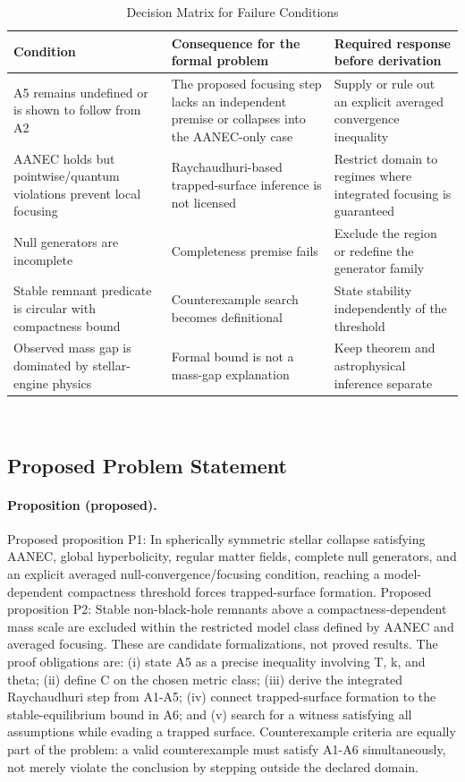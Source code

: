 \documentclass[conference]{IEEEtran}
\begin{document}
\begin{table}[htbp]
\centering
\footnotesize
\setlength{\tabcolsep}{3pt}
\renewcommand{\arraystretch}{1.12}
\caption{Decision Matrix for Failure Conditions}
\label{tab:formal-problem-and-hypotheses-fp-06}
\begin{tabular}{|p{}|p{}|p{}|}
\hline
Condition & Consequence for the formal problem & Required response before derivation \\\hline
A5 remains undefined or is shown to follow from A2 & The proposed focusing step lacks an independent premise or collapses into the AANEC-only case & Supply or rule out an explicit averaged convergence inequality \\\hline
AANEC holds but pointwise/quantum violations prevent local focusing & Raychaudhuri-based trapped-surface inference is not licensed & Restrict domain to regimes where integrated focusing is guaranteed \\\hline
Null generators are incomplete & Completeness premise fails & Exclude the region or redefine the generator family \\\hline
Stable remnant predicate is circular with compactness bound & Counterexample search becomes definitional & State stability independently of the threshold \\\hline
Observed mass gap is dominated by stellar-engine physics & Formal bound is not a mass-gap explanation & Keep theorem and astrophysical inference separate \\\hline
\end{tabular}
\end{table}~\cite{cite_0ed84243cf171bc4,cite_7a44e6730c44cb39,cite_c369df652181e8f7}

\subsection{Proposed Problem Statement}
\paragraph{Proposition (proposed).} Proposed proposition P1: In spherically symmetric stellar collapse satisfying AANEC, global hyperbolicity, regular matter fields, complete null generators, and an explicit averaged null-convergence/focusing condition, reaching a model-dependent compactness threshold forces trapped-surface formation. Proposed proposition P2: Stable non-black-hole remnants above a compactness-dependent mass scale are excluded within the restricted model class defined by AANEC and averaged focusing. These are candidate formalizations, not proved results. The proof obligations are: (i) state A5 as a precise inequality involving T, k, and theta; (ii) define C on the chosen metric class; (iii) derive the integrated Raychaudhuri step from A1-A5; (iv) connect trapped-surface formation to the stable-equilibrium bound in A6; and (v) search for a witness satisfying all assumptions while evading a trapped surface. Counterexample criteria are equally part of the problem: a valid counterexample must satisfy A1-A6 simultaneously, not merely violate the conclusion by stepping outside the declared domain.
\end{document}
